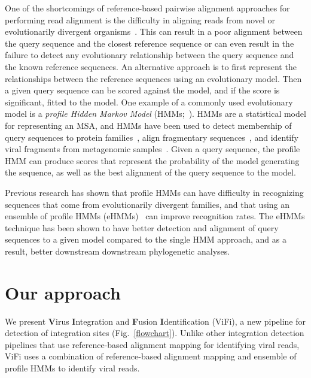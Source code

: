 \documentclass{bioinfo}
\begin{document}
One of the shortcomings of reference-based pairwise alignment approaches for performing read alignment is the difficulty in aligning reads from novel or evolutionarily divergent organisms~\cite{Brenner1998,Park1998}.  This can result in a poor alignment between the query sequence and the closest reference sequence or can even result in the failure to detect any evolutionary relationship between the query sequence and the known reference sequences.  An alternative approach is to first represent the relationships between the reference sequences using an evolutionary model.  Then a given query sequence can be scored against the model, and if the score is significant, fitted to the model.  One example of a commonly used evolutionary model is a \emph{profile Hidden Markov Model} (HMMs;~\cite{Eddy1998}). HMMs are a statistical model for representing an MSA, and HMMs have been used to detect membership of query sequences to protein families~\cite{Finn2010}, align fragmentary sequences~\cite{Eddy1998}, and identify viral fragments from metagenomic samples~\cite{Skewes-Cox2014}.  Given a query sequence, the profile HMM can produce scores that represent the probability of the model generating the sequence, as well as the best alignment of the query sequence to the model.

Previous research has shown that profile HMMs can have difficulty in recognizing sequences that come from evolutionarily divergent families, and that using an ensemble of profile HMMs (eHMMs)~\cite{Mirarab2012,Nguyen2014,Nguyen2015,Nguyen2016_hippi} can improve recognition rates.  The eHMMs technique has been shown to have better detection and alignment of query sequences to a given model compared to the single HMM approach, and as a result, better downstream downstream phylogenetic analyses. 

\section{Our approach}
We present \textbf{V}irus \textbf{I}ntegration and \textbf{F}usion \textbf{I}dentification (ViFi), a new pipeline for detection of integration sites (Fig.~\ref{flowchart}).  Unlike other integration detection pipelines that use reference-based alignment mapping for identifying viral reads, ViFi uses a combination of reference-based alignment mapping and ensemble of profile HMMs to identify viral reads.  
\end{document}
